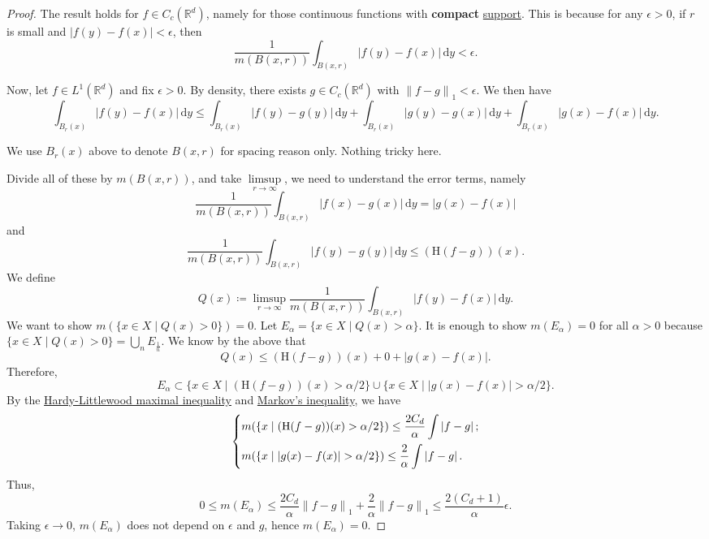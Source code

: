 \begin{proof}
	The result holds for \(f\in C_c(\mathbb{R} ^d)\), namely for those continuous functions with \textbf{compact} \hyperref[def:support]{support}.
	This is because for any \(\epsilon >0\), if \(r\) is small and \(\left\vert f(y) - f(x) \right\vert < \epsilon \), then
	\[
		\frac{1}{m(B(x, r))}\int _{B(x, r)}\left\vert f(y) - f(x) \right\vert \,\mathrm{d} y < \epsilon .
	\]

	Now, let \(f\in L^1(\mathbb{R} ^d)\) and fix \(\epsilon >0\). By density, there exists \(g\in C_c(\mathbb{R} ^d)\) with \(\left\lVert f-g\right\rVert _1<\epsilon \).
	We then have
	\[
		\int_{B_r(x)}\left\vert f(y) - f(x) \right\vert \,\mathrm{d} y
		\leq \int _{B_r(x)}\left\vert f(y) - g(y) \right\vert \,\mathrm{d} y
		+\int _{B_r(x)}\left\vert g(y) - g(x) \right\vert \,\mathrm{d} y
		+\int _{B_r(x)}\left\vert g(x) - f(x) \right\vert \,\mathrm{d} y.
	\]
	\begin{note}
		We use \(B_r(x)\) above to denote \(B(x, r)\) for spacing reason only. Nothing tricky here.
	\end{note}
	Divide all of these by \(m(B(x, r))\), and take \(\limsup\limits_{r \to \infty} \), we need to understand the error terms, namely
	\[
		\frac{1}{m(B(x, r))}\int _{B(x, r)}\left\vert f(x) - g(x) \right\vert \,\mathrm{d} y = \left\vert g(x) - f(x) \right\vert
	\]
	and
	\[
		\frac{1}{m(B(x, r))}\int _{B(x, r)}\left\vert f(y) - g(y) \right\vert \,\mathrm{d} y \leq (\mathrm{H} (f-g))(x).
	\]
	We define
	\[
		Q(x) \coloneqq \limsup_{r \to \infty} \frac{1}{m(B(x, r))}\int _{B(x, r)} \left\vert f(y) - f(x) \right\vert \,\mathrm{d} y.
	\]
	We want to show \(m(\{x\in X\mid Q(x) > 0\}) = 0\). Let \(E_\alpha = \{x\in X\mid Q(x) > \alpha \}\). It is enough to show \(m(E_\alpha ) = 0\)
	for all \(\alpha >0\) because \(\{x\in X\mid Q(x)> 0\}= \bigcup_n E_{\frac{1}{n}}\). We know by the above that
	\[
		Q(x) \leq (\mathrm{H} (f-g))(x) + 0 + \left\vert g(x) - f(x) \right\vert.
	\]
	Therefore,
	\[
		E_\alpha \subset \{x\in X\mid (\mathrm{H} (f-g))(x) > \alpha /2\}\cup \{x\in X\mid \left\vert g(x) - f(x) \right\vert >\alpha /2\}.
	\]
	By the \hyperref[thm:HL-maximal-inequality]{Hardy-Littlewood maximal inequality} and \hyperref[lma:Markov-inequality]{Markov's inequality}, we have
	\[
		\begin{dcases}
			m(\left\{x\mid (\mathrm{H}(f-g))(x) > \alpha / 2\right\})                \leq \frac{2C_{d} }{\alpha }\int \left\vert f - g \right\vert; \\
			m(\left\{x\mid \left\vert g(x) - f(x) \right\vert > \alpha / 2\right\})  \leq \frac{2}{\alpha }\int \left\vert f - g \right\vert.
		\end{dcases}
	\]
	Thus,
	\[
		0\leq m(E_\alpha )\leq \frac{2C_d}{\alpha }\left\lVert f-g\right\rVert _1 + \frac{2}{\alpha }\left\lVert f-g\right\rVert _1 \leq \frac{2(C_{d} +1)}{\alpha }\epsilon.
	\]
	Taking \(\epsilon \to 0\), \(m(E_\alpha )\) does not depend on \(\epsilon \) and \(g\), hence \(m(E_\alpha) = 0\).
\end{proof}
